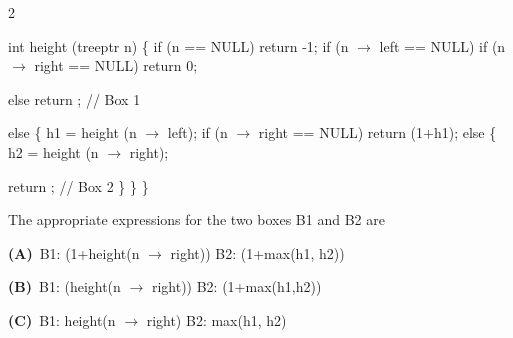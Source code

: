 \documentclass[a4paper,10pt,twoside]{article}
\begin{document}
\begin{multicols}{2}
{\par\smallskip
int height (treeptr n)
\{ if (n == NULL) return -1;
if (n $\to$ left == NULL)
if (n $\to$ right == NULL) return 0;
\par\smallskip
else return ; // Box 1
\par\smallskip
else \{ h1 = height (n $\to$ left);
if (n $\to$ right == NULL) return (1+h1);
else \{ h2 = height (n $\to$ right);
\par\smallskip
return ; // Box 2
\}
\}
\}
\par\smallskip
The appropriate expressions for the two boxes B1 and B2 are \par}
\par\vspace{2pt}\noindent
\textbf{(A)}~B1: (1+height(n $\to$ right)) \newline B2: (1+max(h1, h2))\par\vspace{2pt}\noindent
\textbf{(B)}~B1: (height(n $\to$ right)) \newline B2: (1+max(h1,h2))\par\vspace{2pt}\noindent
\textbf{(C)}~B1: height(n $\to$ right) \newline B2: max(h1, h2)\par\vspace{2pt}\noindent

\end{multicols}
\end{document}
